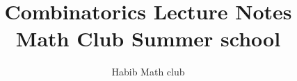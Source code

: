 \documentclass{article}
\begin{document}
\title{Combinatorics Lecture Notes\\
\large Math Club Summer school
}
\author{Habib Math club}
\maketitle


\renewcommand\thefootnote{}


\renewcommand\thefootnote{\fnsymbol{footnote}}
\setcounter{footnote}{1}


 


\end{document}
